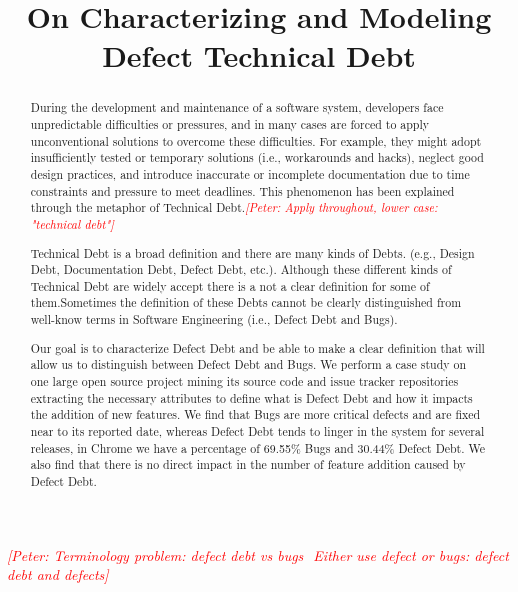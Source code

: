 \documentclass[conference]{IEEEtran}
\newcommand{\peter}[1]{\textcolor{red}{{\it [Peter: #1]}}}
\begin{document}
\title{On Characterizing and Modeling Defect Technical Debt}

\author{

}

\maketitle

\peter{Terminology problem: defect debt vs bugs  Either use defect or bugs: defect debt and defects}
\begin{abstract}
During the development and maintenance of a software system, developers face unpredictable difficulties or pressures, and in many cases are forced to apply unconventional solutions to overcome these difficulties. For example, they might adopt insufficiently tested or temporary solutions (i.e., workarounds and hacks), neglect good design practices, and introduce inaccurate or incomplete documentation
due to time constraints and pressure to meet deadlines. This phenomenon has been explained through the metaphor of Technical Debt.\peter{Apply throughout, lower case: "technical debt"}

Technical Debt is a broad definition and there are many kinds of Debts. (e.g., Design Debt, Documentation Debt, Defect Debt, etc.). Although these different kinds of Technical Debt are widely accept there is a not a clear definition for some of them.Sometimes the definition of these Debts cannot be clearly distinguished from well-know terms in Software Engineering (i.e., Defect Debt and Bugs). 

Our goal is to characterize Defect Debt and be able to make a clear definition that will allow us to distinguish between Defect Debt and Bugs. We perform a case study on one large open source project mining its source code and issue tracker repositories extracting the necessary attributes to define what is Defect Debt and how it impacts the addition of new features. We find that Bugs are more critical defects and are fixed near to its reported date, whereas Defect Debt tends to linger in the system for several releases, in Chrome we have a percentage of 69.55\%  Bugs and 30.44\% Defect Debt. We also find that there is no direct impact in the number of feature addition caused by Defect Debt.
  
\end{abstract}
\end{document}
